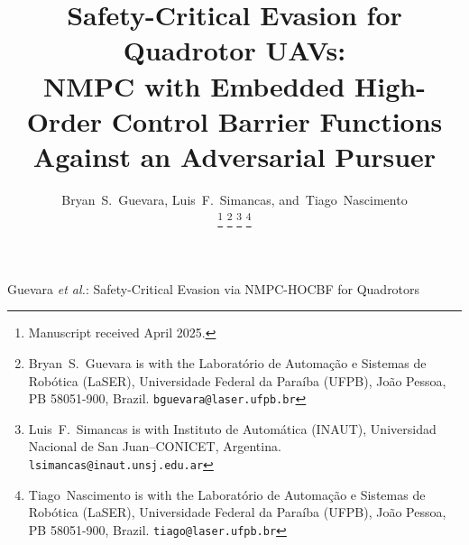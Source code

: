 \documentclass[lettersize,journal]{IEEEtran}
\theoremstyle{definition}
\theoremstyle{remark}
\begin{document}
\title{Safety-Critical Evasion for Quadrotor UAVs:\\
       NMPC with Embedded High-Order Control Barrier Functions\\
       Against an Adversarial Pursuer}

\author{Bryan~S.~Guevara,
        Luis~F.~Simancas,
        and~Tiago~Nascimento%

\thanks{Manuscript received April 2025.}%
\thanks{Bryan~S.~Guevara is with the Laboratório de Automação
        e Sistemas de Robótica (LaSER), Universidade Federal da
        Paraíba (UFPB), João Pessoa, PB 58051-900, Brazil.
        {\tt\small bguevara@laser.ufpb.br}}%
\thanks{Luis~F.~Simancas is with Instituto de Automática (INAUT),
        Universidad Nacional de San Juan--CONICET, Argentina.
        {\tt\small lsimancas@inaut.unsj.edu.ar}}%
\thanks{Tiago~Nascimento is with the Laboratório de Automação
        e Sistemas de Robótica (LaSER), Universidade Federal da
        Paraíba (UFPB), João Pessoa, PB 58051-900, Brazil.
        {\tt\small tiago@laser.ufpb.br}}%
}

%
{Guevara \MakeLowercase{\textit{et al.}}:
 Safety-Critical Evasion via NMPC-HOCBF for Quadrotors}


\maketitle
\end{document}
